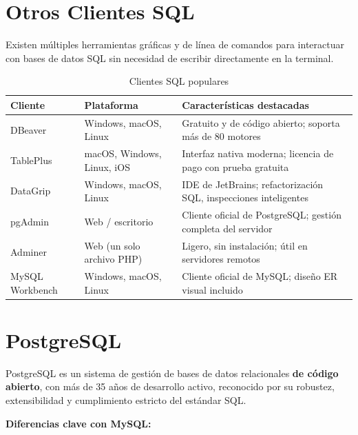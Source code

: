 \newpage
\section{Otros Clientes SQL}

Existen múltiples herramientas gráficas y de línea de comandos para
interactuar con bases de datos SQL sin necesidad de escribir directamente
en la terminal.

\begin{table}[H]
  \centering
  \caption{Clientes SQL populares}
  \renewcommand{\arraystretch}{1.3}
  \begin{tabularx}{\textwidth}{l l X}
    \toprule
    \textbf{Cliente}  & \textbf{Plataforma}          & \textbf{Características destacadas}                  \\
    \midrule
    DBeaver           & Windows, macOS, Linux        & Gratuito y de código abierto; soporta más de 80 motores \\
    TablePlus         & macOS, Windows, Linux, iOS   & Interfaz nativa moderna; licencia de pago con prueba gratuita \\
    DataGrip          & Windows, macOS, Linux        & IDE de JetBrains; refactorización SQL, inspecciones inteligentes \\
    pgAdmin           & Web / escritorio             & Cliente oficial de PostgreSQL; gestión completa del servidor \\
    Adminer           & Web (un solo archivo PHP)    & Ligero, sin instalación; útil en servidores remotos  \\
    MySQL Workbench   & Windows, macOS, Linux        & Cliente oficial de MySQL; diseño ER visual incluido   \\
    \bottomrule
  \end{tabularx}
\end{table}

\section{PostgreSQL}

PostgreSQL es un sistema de gestión de bases de datos relacionales
\textbf{de código abierto}, con más de 35 años de desarrollo activo,
reconocido por su robustez, extensibilidad y cumplimiento estricto del
estándar SQL.

\textbf{Diferencias clave con MySQL:}

